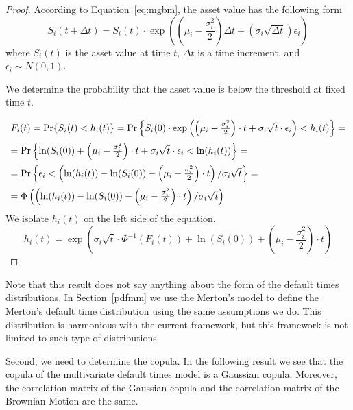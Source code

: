 \documentclass[11pt,fleqn]{book} %
\begin{document}
\begin{proof}
	According to Equation~\ref{eq:mgbm}, the asset value has the following form
	\begin{displaymath}
		S_i(t+\Delta t) = S_i(t) \cdot \exp\left(
		\left(\mu_i - \frac{\sigma_i^2}{2}\right) \Delta t +
		\left(\sigma_i \sqrt{\Delta t}\right) \epsilon_i
		\right)
	\end{displaymath}
	where $S_i(t)$ is the asset value at time $t$, $\Delta t$ is a time increment, 
	and $\epsilon_i \sim N(0,1)$.

	We determine the probability that the asset value is below the threshold at 
	fixed time $t$.
	\begin{displaymath}
		\def\arraystretch{2.0}
		\begin{array}{l}
			F_i(t) = \Pr\{S_i(t) < h_i(t)\} = 
			\Pr\left\{S_i(0)\cdot\exp\left(\left(\mu_i-\frac{\sigma_i^2}{2}\right)\cdot t + \sigma_i\sqrt{t}\cdot\epsilon_i\right) < h_i(t)\right\} =
			\\
			=\Pr\left\{\ln(S_i(0))+\left(\mu_i-\frac{\sigma_i^2}{2}\right)\cdot t + \sigma_i\sqrt{t}\cdot\epsilon_i < \ln(h_i(t))\right\} =
			\\
			=\Pr\left\{\epsilon_i < \left(\ln(h_i(t))-\ln(S_i(0))-\left(\mu_i-\frac{\sigma_i^2}{2}\right)\cdot t\right)/\sigma_i\sqrt{t}\right\} = 
			\\
			=\Phi\left(\left(\ln(h_i(t))-\ln(S_i(0))-\left(\mu_i-\frac{\sigma_i^2}{2}\right)\cdot t\right)/\sigma_i\sqrt{t}\right)
		\end{array}
	\end{displaymath}
	We isolate $h_i(t)$ on the left side of the equation.
	\begin{displaymath}
		h_i(t) = \exp\left(\sigma_i\sqrt{t}\cdot\Phi^{-1}(F_i(t)) + \ln(S_i(0)) + \left(\mu_i-\frac{\sigma_i^2}{2}\right)\cdot t\right)
	\end{displaymath}
	
\end{proof}

Note that this result does not say anything about the form of the default times 
distributions. In Section~\ref{pdfmm} we use the Merton's model to define the 
Merton's default time distribution using the same assumptions we do. This 
distribution is harmonious with the current framework, but this framework is not 
limited to such type of distributions.

Second, we need to determine the copula. In the following result we see that the
copula of the multivariate default times model is a Gaussian copula. Moreover, 
the correlation matrix of the Gaussian copula and the correlation matrix of the 
Brownian Motion are the same.
\end{document}
